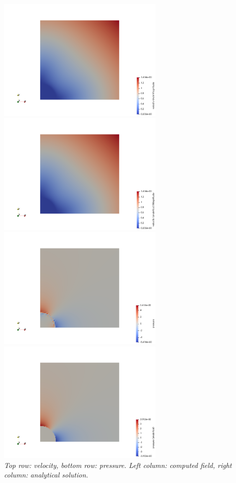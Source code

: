 \documentclass[a4paper]{article}
\begin{document}
\begin{center}
\includegraphics[width=8cm]{./results/benchmark_solvi/vel}
\includegraphics[width=8cm]{./results/benchmark_solvi/vel_analytical}\\
\includegraphics[width=8cm]{./results/benchmark_solvi/press}
\includegraphics[width=8cm]{./results/benchmark_solvi/press_analytical}\\
{\it Top row: velocity, bottom row: pressure. Left column: computed field, 
right column: analytical solution.}
\end{center}
\end{document}
